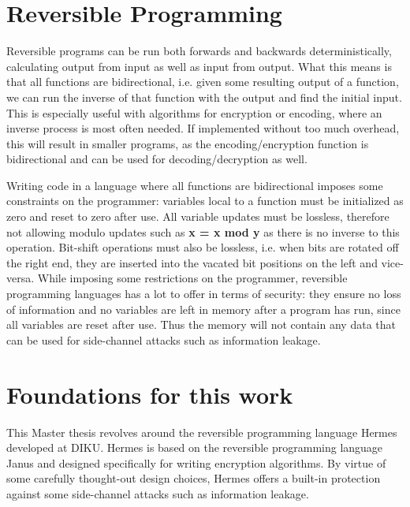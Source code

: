 \section{Reversible Programming}
Reversible programs can be run both forwards and backwards deterministically, calculating output from input as well as input from output.
What this means is that all functions are bidirectional, i.e. given some resulting output of a function, we can run the inverse of that function with the output and find the initial input.
This is especially useful with algorithms for encryption or encoding, where an inverse process is most often needed.
If implemented without too much overhead, this will result in smaller programs, as the encoding/encryption function is bidirectional and can be used for decoding/decryption as well.

Writing code in a language where all functions are bidirectional imposes some constraints on the programmer: variables local to a function must be initialized as zero and reset to zero after use.
All variable updates must be lossless, therefore not allowing modulo updates such as \textbf{x = x mod y} as there is no inverse to this operation.
Bit-shift operations must also be lossless, i.e. when bits are rotated off the right end, they are inserted into the vacated bit positions on the left and vice-versa. While imposing some restrictions on the programmer, reversible programming languages has a lot to offer in terms of security: they ensure no loss of information and no variables are left in memory after a program has run, since all variables are reset after use. Thus the memory will not contain any data that can be used for side-channel attacks such as information leakage.

\section{Foundations for this work}
This Master thesis revolves around the reversible programming language Hermes developed at DIKU.
Hermes is based on the reversible programming language Janus and designed specifically for writing encryption algorithms\cite{MogensenHermes}.
By virtue of some carefully thought-out design choices, Hermes offers a built-in protection against some side-channel attacks such as information leakage.


